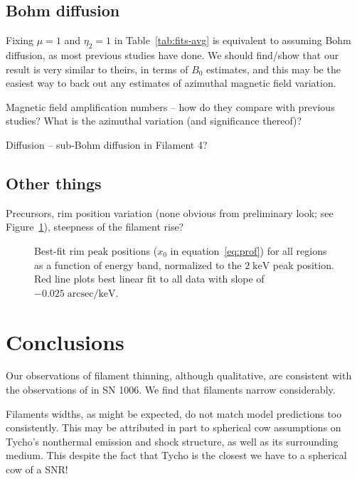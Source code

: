 \documentclass[iop, apj, numberedappendix, twocolappendix]{emulateapj}
\newcommand*{\mt}{\mathrm}
\newcommand*{\unit}[1]{\;\mt{#1}}  %
\begin{document}
\subsection{Bohm diffusion}

Fixing $\mu = 1$ and $\eta_2 = 1$ in Table~\ref{tab:fits-avg} is equivalent to
assuming Bohm diffusion, as most previous studies have done.
We should find/show that our result is very similar to theirs, in terms of
$B_0$ estimates, and this may be the easiest way to back out any estimates of
azimuthal magnetic field variation.

Magnetic field amplification numbers -- how do they compare with previous
studies?  What is the azimuthal variation (and significance thereof)?

Diffusion -- sub-Bohm diffusion in Filament 4?

\subsection{Other things}

Precursors, rim position variation (none obvious from preliminary look; see
Figure~\ref{fig:peak-pos}), steepness of the filament rise?

\begin{figure}[ht]
    \centering
    \caption{Best-fit rim peak positions ($x_0$ in equation~\eqref{eq:prof})
        for all regions as a function of energy band, normalized to the $2
        \unit{keV}$ peak position.  Red line plots best linear fit to all data
        with slope of $-0.025 \unit{arcsec/keV}$.
        \label{fig:peak-pos}}
\end{figure}

\section{Conclusions}

Our observations of filament thinning, although qualitative, are consistent
with the observations of \citet{ressler2014} in SN 1006.
We find that filaments narrow considerably.

Filaments widths, as might be expected, do not match model predictions too
consistently.  This may be attributed in part to spherical cow assumptions on
Tycho's nonthermal emission and shock structure, as well as its surrounding
medium.  This despite the fact that Tycho is the closest we have to a spherical
cow of a SNR!
\end{document}
